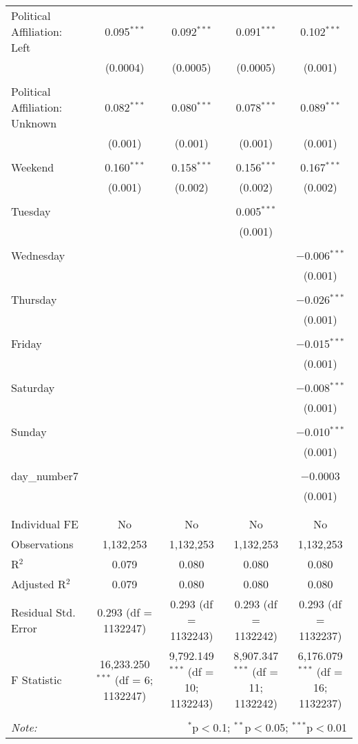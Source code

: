 \documentclass[
]{article}
\begin{document}
\begin{table}[!htbp]
{\begin{tabular}{@{\extracolsep{5pt}}lcccc}
 Political Affiliation: Left & 0.095$^{***}$ & 0.092$^{***}$ & 0.091$^{***}$ & 0.102$^{***}$ \\ 
  & (0.0004) & (0.0005) & (0.0005) & (0.001) \\ 
  & & & & \\ 
 Political Affiliation: Unknown & 0.082$^{***}$ & 0.080$^{***}$ & 0.078$^{***}$ & 0.089$^{***}$ \\ 
  & (0.001) & (0.001) & (0.001) & (0.001) \\ 
  & & & & \\ 
 Weekend & 0.160$^{***}$ & 0.158$^{***}$ & 0.156$^{***}$ & 0.167$^{***}$ \\ 
  & (0.001) & (0.002) & (0.002) & (0.002) \\ 
  & & & & \\ 
 Tuesday &  &  & 0.005$^{***}$ &  \\ 
  &  &  & (0.001) &  \\ 
  & & & & \\ 
 Wednesday &  &  &  & $-$0.006$^{***}$ \\ 
  &  &  &  & (0.001) \\ 
  & & & & \\ 
 Thursday &  &  &  & $-$0.026$^{***}$ \\ 
  &  &  &  & (0.001) \\ 
  & & & & \\ 
 Friday &  &  &  & $-$0.015$^{***}$ \\ 
  &  &  &  & (0.001) \\ 
  & & & & \\ 
 Saturday &  &  &  & $-$0.008$^{***}$ \\ 
  &  &  &  & (0.001) \\ 
  & & & & \\ 
 Sunday &  &  &  & $-$0.010$^{***}$ \\ 
  &  &  &  & (0.001) \\ 
  & & & & \\ 
 day\_number7 &  &  &  & $-$0.0003 \\ 
  &  &  &  & (0.001) \\ 
  & & & & \\ 
\hline \\[-1.8ex] 
Individual FE & No & No & No & No \\ 
Observations & 1,132,253 & 1,132,253 & 1,132,253 & 1,132,253 \\ 
R$^{2}$ & 0.079 & 0.080 & 0.080 & 0.080 \\ 
Adjusted R$^{2}$ & 0.079 & 0.080 & 0.080 & 0.080 \\ 
Residual Std. Error & 0.293 (df = 1132247) & 0.293 (df = 1132243) & 0.293 (df = 1132242) & 0.293 (df = 1132237) \\ 
F Statistic & 16,233.250$^{***}$ (df = 6; 1132247) & 9,792.149$^{***}$ (df = 10; 1132243) & 8,907.347$^{***}$ (df = 11; 1132242) & 6,176.079$^{***}$ (df = 16; 1132237) \\ 
\hline 
\hline \\[-1.8ex] 
\textit{Note:}  & \multicolumn{4}{r}{$^{*}$p$<$0.1; $^{**}$p$<$0.05; $^{***}$p$<$0.01} \\ 
\end{tabular}
} 
\end{table} 
\newpage
\end{document}
